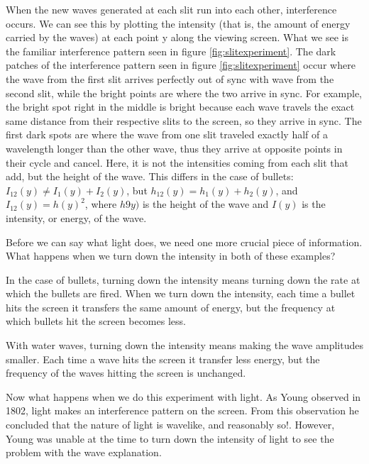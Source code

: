When the new waves generated at each slit run into each other, interference occurs. We can see this by plotting the intensity (that is, the amount of energy carried by the waves) at each point y along the viewing screen. What we see is the familiar interference pattern seen in figure \ref{fig:slitexperiment}. The dark patches of the interference pattern seen in figure \ref{fig:slitexperiment} occur where the wave from the first slit arrives perfectly out of sync with wave from the second slit, while the bright points are where the two arrive in sync. For example, the bright spot right in the middle is bright because each wave travels the exact same distance from their respective slits to the screen, so they arrive in sync. The first dark spots are where the wave from one slit traveled exactly half of a wavelength longer than the other wave, thus they arrive at opposite points in their cycle and cancel. Here, it is not the intensities coming from each slit that add, but the height of the wave. This differs in the case of bullets: $I_{12}(y)\neq I_1(y)+I_2(y)$, but $h_{12}(y)=h_1(y)+h_2(y)$, and $I_{12}(y)=h(y)^2$, where $h9y)$ is the height of the wave and $I(y)$ is the intensity, or energy, of the wave.

Before we can say what light does, we need one more crucial piece of information. What happens when we turn down the intensity in both of these examples?

In the case of bullets, turning down the intensity means turning down the rate at which the bullets are fired. When we turn down the intensity, each time a bullet hits the screen it transfers the same amount of energy, but the frequency at which bullets hit the screen becomes less.

With water waves, turning down the intensity means making the wave amplitudes smaller. Each time a wave hits the screen it transfer less energy, but the frequency of the waves hitting the screen is unchanged.

Now what happens when we do this experiment with light. As Young observed in 1802, light makes an interference pattern on the screen. From this observation he concluded that the nature of light is wavelike, and reasonably so!.  However, Young was unable at the time to turn down the intensity of light to see the problem with the wave explanation.

